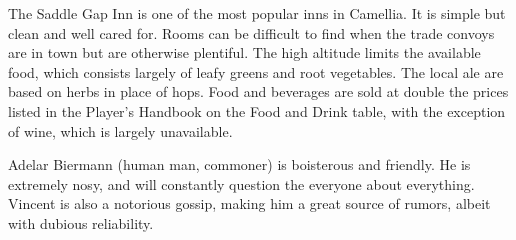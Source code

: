 The Saddle Gap Inn is one of the most popular inns in Camellia.
It is simple but clean and well cared for.
Rooms can be difficult to find when the trade convoys are in town but are otherwise plentiful.
The high altitude limits the available food, which consists largely of leafy greens and root vegetables.
The local ale are based on herbs in place of hops.
Food and beverages are sold at double the prices listed in the Player's Handbook on the Food and Drink table, with the exception of wine, which is largely unavailable.

Adelar Biermann (human man, commoner) is boisterous and friendly.
He is extremely nosy, and will constantly question the everyone about everything.
Vincent is also a notorious gossip, making him a great source of rumors, albeit with dubious reliability.

